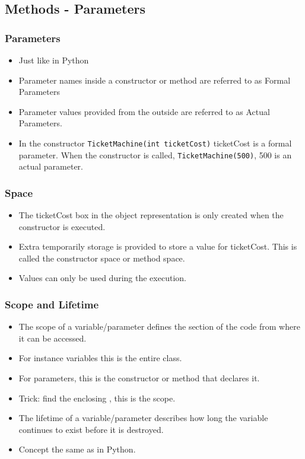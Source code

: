 \subsection{Methods - Parameters}

\begin{frame}[fragile]
\frametitle{Parameters}
\begin{itemize}
\item Just like in Python
\item Parameter names inside a constructor or method are referred to as \alert{Formal Parameters}
\item Parameter values provided from the outside are referred to as \alert{Actual Parameters}.
\item In the constructor \lstinline!TicketMachine(int ticketCost)! ticketCost is a 
formal parameter. When the constructor is called, \lstinline!TicketMachine(500)!, 500 is an actual parameter.
\end{itemize}
\end{frame}

\begin{frame}
\frametitle{Space}
\begin{itemize}
\item The ticketCost box  in the object representation is only created when the constructor is executed.
\item Extra temporarily storage is provided to store a value for ticketCost. This is called the constructor space or method space.
\item Values can only be used during the execution. 
\end{itemize}
\end{frame}

\begin{frame}
\frametitle{Scope and Lifetime}
\begin{itemize}
\item The \alert{scope} of a variable/parameter defines the section of the code from where it can be accessed.
\item For instance variables this is the entire class.
\item For parameters, this is the constructor or method that declares it. 
\item Trick: find the enclosing {}, this is the scope. 
\item The \alert{lifetime} of a variable/parameter describes how long the variable continues to exist before it is destroyed.
\item Concept the same as in Python. 
\end{itemize}
\end{frame}

